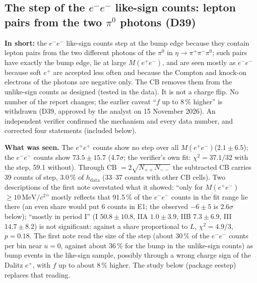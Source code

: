 \documentclass[11pt,a4paper]{article}
\newcommand{\piz}{\ensuremath{\pi^{0}}\xspace}
\newcommand{\pipi}{\ensuremath{\pi^{+}\pi^{-}}\xspace}
\newcommand{\Mee}{\ensuremath{M(e^{+}e^{-})}\xspace}
\newcommand{\MeVcc}{\ensuremath{\mathrm{MeV}/c^{2}}\xspace}
\newcommand{\tipbox}[1]{\par\noindent\colorbox{blue!6}{\parbox{\dimexpr\linewidth-2\fboxsep\relax}{#1}}\par}
\newcommand{\inshort}[1]{\tipbox{\textbf{In short:} #1}}%
\begin{document}
\subsection{The step of the \texorpdfstring{$e^-e^-$}{e-e-} like-sign counts: lepton pairs from the two \texorpdfstring{$\pi^0$}{pi0} photons (D39)}
\label{sec:edgeu-ls}
\inshort{the $e^-e^-$ like-sign counts step at the bump edge because they contain lepton pairs from the two different photons of the \piz in
$\eta\to\pipi\piz$; such pairs have exactly the bump edge, lie at large \Mee, and are seen mostly as $e^-e^-$ because soft $e^+$ are accepted less
often and because the Compton and knock-on electrons of the photons are negative only. The CB removes them from the unlike-sign counts as designed
(tested in the data). It is not a charge flip. No number of the report changes; the earlier caveat ``$f$ up to 8\,\% higher'' is withdrawn (D39,
approved by the analyst on 15 November 2026). An independent verifier confirmed the mechanism and every data number, and corrected four statements (included below).}

\textbf{What was seen.} The $e^+e^+$ counts show no step over all \Mee ($2.1\pm6.5$); the $e^-e^-$ counts show $73.5\pm15.7$ (4.7$\sigma$;
the verifier's own fit: $\chi^2=37.1/32$ with the step, 59.1 without). Through CB $=2\sqrt{N_{++}N_{--}}$ the subtracted CB carries 39 counts of
step, 3.0\,\% of $h_{\mathrm{data}}$ (33--37 counts with other CB cells). Two descriptions of the first note overstated what it showed: ``only for
\Mee$\ge10$\,\MeVcc'' mostly reflects that 91.5\,\% of the $e^-e^-$ counts in the fit range lie there (an even share would put 6 counts in E1; the
observed $-6\pm5$ is 2.6$\sigma$ below); ``mostly in period I'' (I $50.8\pm10.8$, IIA $1.0\pm3.9$, IIB $7.3\pm6.9$, III $14.7\pm8.2$) is not
significant: against a share proportional to $L$, $\chi^2=4.9/3$, $p=0.18$. The first note read the size of the step (about 30\,\% of the
$e^-e^-$ counts per bin near $u=0$, against about 36\,\% for the bump in the unlike-sign counts) as bump events in the like-sign sample, possibly
through a wrong charge sign of the Dalitz $e^+$, with $f$ up to about 8\,\% higher. The study below (package eestep) replaces that reading.
\end{document}
